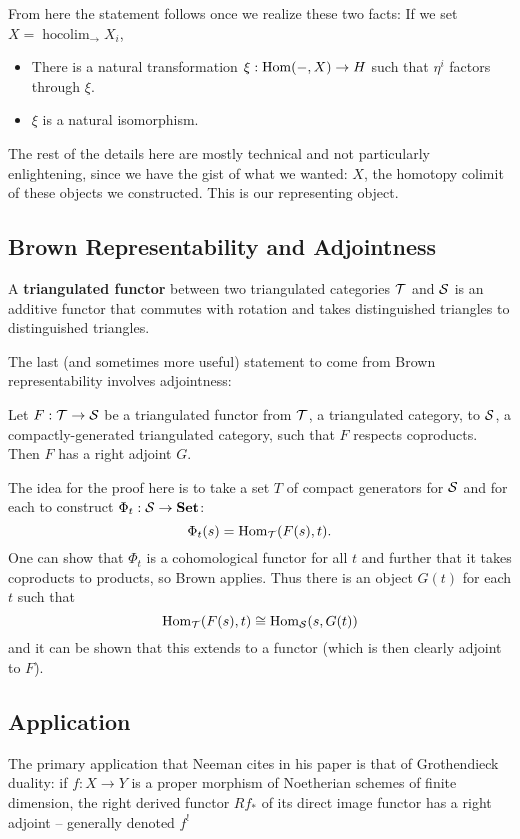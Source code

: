 \documentclass[12pt]{article}
\newcommand*{\Set}{\mathbf{Set}}
\begin{document}
\begin{prf}
	\brk

	From here the statement follows once we realize these two facts: If we set $X=\operatorname{hocolim}_{\to}X_i$,
	\begin{itemize}
		\item There is a natural transformation $\xi:\operatorname{Hom}(-,X)\to H$ such that $\eta^i$ factors through $\xi$.
		\item $\xi$ is a natural isomorphism.
	\end{itemize}
\end{prf}
\begin{rmk}
	The rest of the details here are mostly technical and not particularly enlightening, since we have the gist 
	of what we wanted: $X$, the homotopy colimit of these objects we constructed. This is our representing object.
\end{rmk}

\subsection{Brown Representability and Adjointness}
\begin{defn}
	A \textbf{triangulated functor} between two triangulated categories $\mathcal{T}$ and $\mathcal{S}$ is an additive functor that 
	commutes with rotation and takes distinguished triangles to distinguished triangles.
\end{defn}
The last (and sometimes more useful) statement to come from Brown representability involves adjointness:
\begin{cor}
	Let $F:\mathcal{T}\to\mathcal{S}$ be a triangulated functor from $\mathcal{T}$, a triangulated category, to $\mathcal{S}$, a compactly-generated triangulated category, such that $F$ respects coproducts. 
	Then $F$ has a right adjoint $G$.
\end{cor}
\begin{rmk}
	The idea for the proof here is to take a set $T$ of compact generators for $\mathcal{S}$ and for each to construct $\Phi_t:\calS\to\Set$:
	\[\Phi_t(s)=\operatorname{Hom}_{\mathcal{T}}(F(s),t).\]
	One can show that $\Phi_t$ is a cohomological functor for all $t$ and further that it takes coproducts to products, so Brown applies.
	Thus there is an object $G(t)$ for each $t$ such that 
	\[\operatorname{Hom}_{\mathcal{T}}(F(s),t)\cong\operatorname{Hom}_{\mathcal{S}}(s,G(t))\]
	and it can be shown that this extends to a functor (which is then clearly adjoint to $F$).
\end{rmk}

\subsection{Application}
The primary application that Neeman cites in his paper is that of Grothendieck duality:
if $f:X\to Y$ is a proper morphism of Noetherian schemes of finite dimension, the right derived
functor $Rf_\ast$ of its direct image functor has a right adjoint -- generally denoted $f^!$
\end{document}
